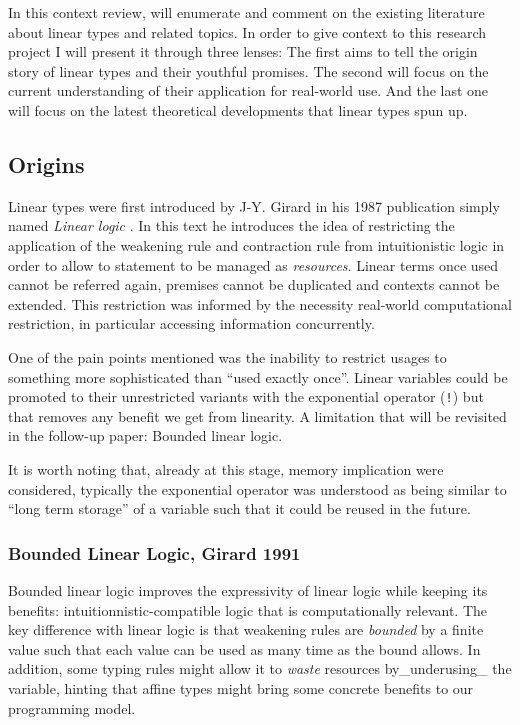 \documentclass[
]{article}
\begin{document}
In this context review, will enumerate and comment on the existing
literature about linear types and related topics. In order to give
context to this research project I will present it through three lenses:
The first aims to tell the origin story of linear types and their
youthful promises. The second will focus on the current understanding of
their application for real-world use. And the last one will focus on the
latest theoretical developments that linear types spun up.

\hypertarget{origins}{%
\subsection{Origins}\label{origins}}

Linear types were first introduced by J-Y. Girard in his 1987
publication simply named \emph{Linear logic} . In this text he
introduces the idea of restricting the application of the weakening rule
and contraction rule from intuitionistic logic in order to allow to
statement to be managed as \emph{resources}. Linear terms once used
cannot be referred again, premises cannot be duplicated and contexts
cannot be extended. This restriction was informed by the necessity
real-world computational restriction, in particular accessing
information concurrently.

One of the pain points mentioned was the inability to restrict usages to
something more sophisticated than ``used exactly once''. Linear
variables could be promoted to their unrestricted variants with the
exponential operator (\texttt{!}) but that removes any benefit we get
from linearity. A limitation that will be revisited in the follow-up
paper: Bounded linear logic.

It is worth noting that, already at this stage, memory implication were
considered, typically the exponential operator was understood as being
similar to ``long term storage'' of a variable such that it could be
reused in the future.

\hypertarget{bounded-linear-logic-girard-1991}{%
\subsubsection{Bounded Linear Logic, Girard
1991}\label{bounded-linear-logic-girard-1991}}

Bounded linear logic improves the expressivity of linear logic while
keeping its benefits: intuitionnistic-compatible logic that is
computationally relevant. The key difference with linear logic is that
weakening rules are \emph{bounded} by a finite value such that each
value can be used as many time as the bound allows. In addition, some
typing rules might allow it to \emph{waste} resources by\_underusing\_
the variable, hinting that affine types might bring some concrete
benefits to our programming model.
\end{document}
